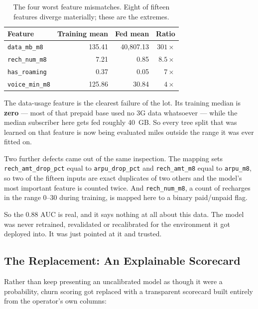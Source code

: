 \begin{table}[H]
\centering
\begin{tabular}{lrrr}
\toprule
\textbf{Feature} & \textbf{Training mean} & \textbf{Fed mean} & \textbf{Ratio} \\
\midrule
\texttt{data\_mb\_m8}     & 135.41 & 40{,}807.13 & $301\times$ \\
\texttt{rech\_num\_m8}    &   7.21 &        0.85 & $8.5\times$ \\
\texttt{has\_roaming}     &   0.37 &        0.05 & $7\times$ \\
\texttt{voice\_min\_m8}   & 125.86 &       30.84 & $4\times$ \\
\bottomrule
\end{tabular}
\caption{The four worst feature mismatches. Eight of fifteen features diverge
materially; these are the extremes.}
\label{tab:churn-transfer}
\end{table}

The data-usage feature is the clearest failure of the lot. Its training median
is \textbf{zero} --- most of that prepaid base used no 3G data whatsoever ---
while the median subscriber here gets fed roughly 40~GB. So every tree split
that was learned on that feature is now being evaluated miles outside the range
it was ever fitted on.

Two further defects came out of the same inspection. The mapping sets
\texttt{rech\_amt\_drop\_pct} equal to \texttt{arpu\_drop\_pct} and
\texttt{rech\_amt\_m8} equal to \texttt{arpu\_m8}, so two of the fifteen inputs are
exact duplicates of two others and the model's most important feature is counted
twice. And \texttt{rech\_num\_m8}, a count of recharges in the range 0--30 during
training, is mapped here to a binary paid/unpaid flag.

So the 0.88 AUC is real, and it says nothing at all about this data. The model
was never retrained, revalidated or recalibrated for the environment it got
deployed into. It was just pointed at it and trusted.

\subsection{The Replacement: An Explainable Scorecard}

Rather than keep presenting an uncalibrated model as though it were a
probability, churn scoring got replaced with a transparent scorecard built
entirely from the operator's own columns:

